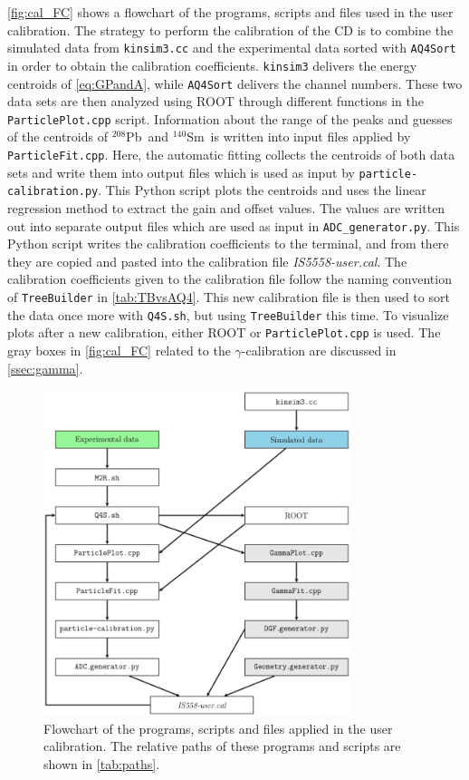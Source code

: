 \documentclass[twoside,english]{uiofysmaster/uiofysmaster}
\newcommand{\Sm}{$^{140}$Sm} %
\newcommand{\Pb}{$^{208}$Pb}
\newcommand{\ga}{$\gamma$}
\let\orgautoref\autoref
\renewcommand{\autoref}
        {%
		 \def\sectionautorefname{Section}%
		 \def\subsectionautorefname{Section}%
		 \def\subsubsectionautorefname{Section}%
		 \def\chapterautorefname{Chapter}%
          \orgautoref}
\begin{document}
\autoref{fig:cal_FC} shows a flowchart of the programs, scripts and files used in the user calibration. 
The strategy to perform the calibration of the CD is to combine the simulated data from \texttt{kinsim3.cc} and the experimental data sorted with \texttt{AQ4Sort} in order to obtain the calibration coefficients.
\texttt{kinsim3} delivers the energy centroids of \autoref{eq:GPandA}, while \texttt{AQ4Sort} delivers the channel numbers.
These two data sets are then analyzed using ROOT through different functions in the \texttt{ParticlePlot.cpp} script. 
Information about the range of the peaks and guesses of the centroids of \Pb\ and \Sm\ is written into input files applied by \texttt{ParticleFit.cpp}. 
Here, the automatic fitting collects the centroids of both data sets and write them into output files which is used as input by \texttt{particle-calibration.py}. 
This Python script plots the centroids and uses the linear regression method to extract the gain and offset values.
The values are written out into separate output files which are used as input in \texttt{ADC\_generator.py}. 
This Python script writes the calibration coefficients to the terminal, and from there they are copied and pasted into the calibration file \textit{IS5558-user.cal}.
The calibration coefficients given to the calibration file follow the naming convention of \texttt{TreeBuilder} in \autoref{tab:TBvsAQ4}. 
This new calibration file is then used to sort the data once more with \texttt{Q4S.sh}, but using \texttt{TreeBuilder} this time.
To visualize plots after a new calibration, either ROOT or \texttt{ParticlePlot.cpp} is used. 
The gray boxes in \autoref{fig:cal_FC} related to the \ga-calibration are discussed in \autoref{ssec:gamma}.

\begin{figure}[ht]
	\centering
	\includegraphics[width=0.8\textwidth]{Images/Flowchart.png}
	\caption{Flowchart of the programs, scripts and files applied in the user calibration. The relative paths of these programs and scripts are shown in \autoref{tab:paths}.}
	\label{fig:cal_FC}
\end{figure}
\end{document}
